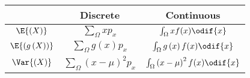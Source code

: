 \documentclass{article}
\begin{document}
\begin{multicols}{3}

\begin{minipage}{70mm}
    \begin{table}[H]
        \centering
        \scriptsize
        \begin{tabular}{c c c }
            \toprule
                                                     & \textbf{Discrete}                              & \textbf{Continuous}                                    \\
            \midrule
            \(\E{\left( X \right)}\)                 & \(\sum_{\Omega} xp_x\)                         & \(\int_{\Omega} xf(x)\odif{x}\)                        \\
            \(\E{\left( g\left( X \right) \right)}\) & \(\sum_{\Omega} g\left( x \right)p_x\)         & \(\int_{\Omega} g\left( x \right)f(x)\odif{x}\)        \\
            \(\Var{\left( X \right)}\)               & \(\sum_{\Omega} \left( x - \mu \right)^2 p_x\) & \(\int_{\Omega} \left( x - \mu \right)^2f(x)\odif{x}\) \\
            \bottomrule
        \end{tabular}
    \end{table}
\end{minipage}
\end{multicols}
\end{document}
